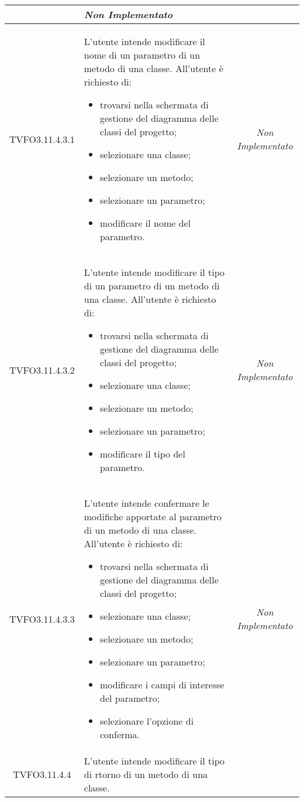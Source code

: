 \begin{longtable}{|c|>{}m{8cm}|c|}
\begin{itemize}
\end{itemize} & \textit{Non Implementato}\\ \hline
\hypertarget{TVFO3.11.4.3.1}{TVFO3.11.4.3.1} & L'utente intende modificare il nome di un parametro di un metodo di una classe.
All'utente è richiesto di:
\begin{itemize}
\item trovarsi nella schermata di gestione del diagramma delle classi del progetto;
\item selezionare una classe; 
\item selezionare un metodo; 
\item selezionare un parametro;
\item modificare il nome del parametro.
\end{itemize} & \textit{Non Implementato}\\ \hline
\hypertarget{TVFO3.11.4.3.2}{TVFO3.11.4.3.2} & L'utente intende modificare il tipo di un parametro di un metodo di una classe.
All'utente è richiesto di:
\begin{itemize}
\item trovarsi nella schermata di gestione del diagramma delle classi del progetto;
\item selezionare una classe; 
\item selezionare un metodo;
\item selezionare un parametro;
\item modificare il tipo del parametro.
\end{itemize} & \textit{Non Implementato}\\ \hline
\hypertarget{TVFO3.11.4.3.3}{TVFO3.11.4.3.3} & L'utente intende confermare le modifiche apportate al parametro di un metodo di una classe.
All'utente è richiesto di:
\begin{itemize}
\item trovarsi nella schermata di gestione del diagramma delle classi del progetto;
\item selezionare una classe;
\item selezionare un metodo;
\item selezionare un parametro;
\item modificare i campi di interesse del parametro;
\item selezionare l'opzione di conferma.
\end{itemize} & \textit{Non Implementato}\\ \hline
\hypertarget{TVFO3.11.4.4}{TVFO3.11.4.4} & L'utente intende modificare il tipo di rtorno di un metodo di una classe.

\end{longtable}
